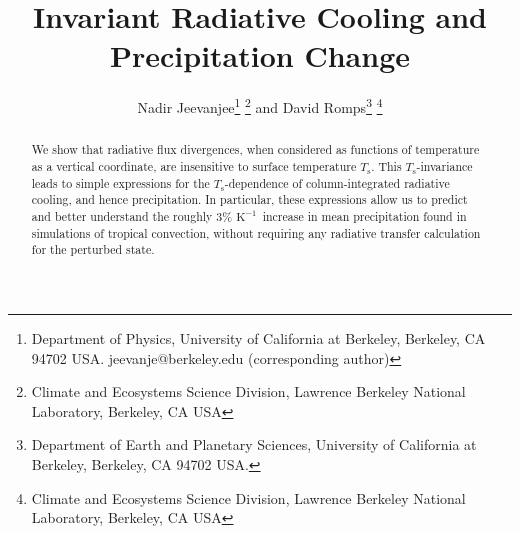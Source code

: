 \documentclass[10pt]{article}
\newcommand{\Ts}{\ensuremath{T_\mathrm{s}}}
\newcommand{\Kinverse}{\ensuremath{\mathrm{K^{-1}}}}
\begin{document}
%
%


\title{Invariant Radiative Cooling and Precipitation Change}

%
%


 \author{Nadir Jeevanjee\footnote{Department of Physics, University of California at Berkeley, Berkeley, CA 94702  USA. jeevanje@berkeley.edu (corresponding author)} \footnote{Climate and Ecosystems Science Division, Lawrence Berkeley National Laboratory, Berkeley, CA USA} and David Romps\footnote{Department of Earth and Planetary Sciences, University of California at Berkeley, Berkeley, CA 94702  USA.} \footnote{Climate and Ecosystems Science Division, Lawrence Berkeley National Laboratory, Berkeley, CA USA}
}

\maketitle

\begin{abstract}
We show that radiative flux divergences, when considered as functions of temperature as a vertical coordinate, are insensitive to surface temperature \Ts. This \Ts-invariance  leads to simple expressions for the \Ts-dependence of column-integrated radiative cooling, and hence precipitation. In particular, these expressions allow us to predict and better understand the roughly 3\% \Kinverse\ increase in mean precipitation  found in simulations of tropical convection, without requiring any radiative transfer calculation for the perturbed state. 

%
%
\end{abstract}


%
%
\end{document}
